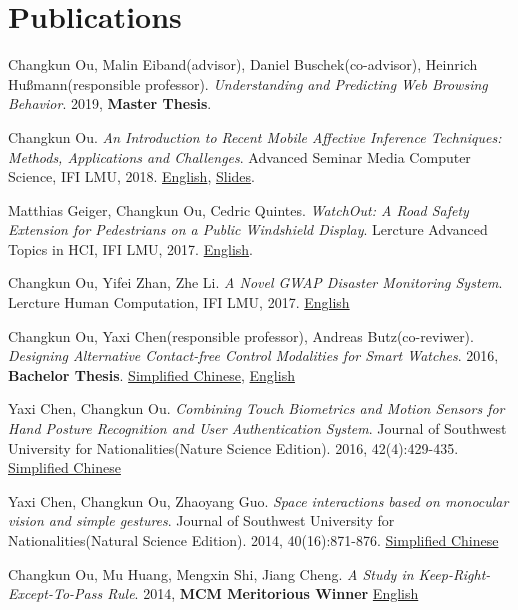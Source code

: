 \section{\textbf{Publications}}
 \resumeSubHeadingListStart
    \item{
        Changkun Ou, Malin Eiband(advisor), Daniel Buschek(co-advisor), Heinrich Hußmann(responsible professor).
        \emph{Understanding and Predicting Web Browsing Behavior}. 
        2019, \textbf{Master Thesis}.
    }
    \item{
        Changkun Ou.
        \emph{An Introduction to Recent Mobile Affective Inference Techniques: Methods, Applications and Challenges}.
        Advanced Seminar Media Computer Science, IFI LMU, 2018. \href{https://github.com/changkun/hs-ws17-mobile-emotion-inference/blob/master/src/lmumihs-ou.pdf}{English}, \href{https://github.com/changkun/hs-ws17-mobile-emotion-inference/blob/master/slides/presentation-final.pdf}{Slides}.
    }
    \item{
        Matthias Geiger, Changkun Ou, Cedric Quintes.
        \emph{WatchOut: A Road Safety Extension for Pedestrians on a Public Windshield Display}.
        Lercture Advanced Topics in HCI, IFI LMU, 2017. \href{https://github.com/changkun/ath-windshild-display/blob/master/paper/ath.pdf}{English}.
    }
    \item{
        Changkun Ou, Yifei Zhan, Zhe Li.
        \emph{A Novel GWAP Disaster Monitoring System}.
        Lercture Human Computation, IFI LMU, 2017.
        \href{https://github.com/changkun/hc-ss17-disaster-monitoring/blob/master/report/hc_final_project_report_team_Hotpot.pdf}{English}
    }
    \item{
        Changkun Ou, Yaxi Chen(responsible professor), Andreas Butz(co-reviwer).
        \emph{Designing Alternative Contact-free Control Modalities for Smart Watches}. 
        2016, \textbf{Bachelor Thesis}. \href{https://changkun.us/files/cv/bachelor-thesis-cn.html}{Simplified Chinese}, 
        \href{https://changkun.us/files/cv/bachelor-thesis-en.html}{English}
    }
    \item{
        Yaxi Chen, Changkun Ou. 
        \emph{Combining Touch Biometrics and Motion Sensors for Hand Posture Recognition and User Authentication System}. 
        Journal of Southwest University for Nationalities(Nature Science Edition). 
        2016, 42(4):429-435. \href{https://changkun.us/files/cv/touch.swun.html}{Simplified Chinese}
    }
    \item{
        Yaxi Chen, Changkun Ou, Zhaoyang Guo.
        \emph{Space interactions based on monocular vision and simple gestures}. 
        Journal of Southwest University for Nationalities(Natural Science Edition). 
        2014, 40(16):871-876. \href{https://changkun.us/files/cv/vision.swun.html}{Simplified Chinese}
    }
    \item{
        Changkun Ou, Mu Huang, Mengxin Shi, Jiang Cheng. 
        \emph{A Study in Keep-Right-Except-To-Pass Rule}. 
        2014, \textbf{MCM Meritorious Winner} \href{https://changkun.us/files/cv/28922.public.html}{English}
    }
 \resumeSubHeadingListEnd